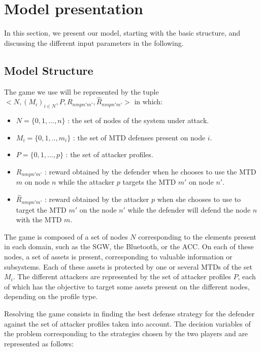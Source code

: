 \section {Model presentation}

{\huge I}n this section, we present our model, starting with the basic structure, and discussing the different input parameters in the following.

\subsection{Model Structure}

\label{game_struct}

The game we use will be represented by the tuple $<N, (M_i)_{i \in N}, P, R_{nmpn'm'}, \widehat{R}_{nmpn'm'}>$ in which: 

\begin{itemize}
	\item $N = \{0, 1,...,n\}$ : the set of nodes of the system under attack. 
	\item $M_i = \{0,1,..,m_i\}$ : the set of MTD defenses present on node $i$. 
	\item $P = \{0, 1,...,p\}$ : the set of attacker profiles.
	\item $R_{nmpn'm'}$ : reward obtained by the defender when he chooses to use the MTD $m$ on node $n$ while the attacker $p$ targets the MTD $m'$ on node $n'$.
	\item $\widehat{R}_{nmpn'm'}$ : reward obtained by the attacker $p$ when she chooses to use to target the MTD $m'$ on the node $n'$ while the defender will defend the node $n$ with the MTD $m$. \\
\end{itemize}


The game is composed of a set of nodes $N$ corresponding to the elements present in each domain, such as the SGW, the Bluetooth, or the ACC.
On each of these nodes, a set of assets is present, corresponding to  valuable information or subsystems. 
Each of these assets is protected by one or several MTDs of the set $M_i$.
The different attackers are represented by the set of attacker profiles $P$, each of which has the objective to target some assets present on the different nodes, depending on the profile type.

Resolving the game consists in finding the best defense strategy for the defender against the set of attacker profiles taken into account.
The decision variables of the problem corresponding to the strategies chosen by the two players and are represented as follows:

